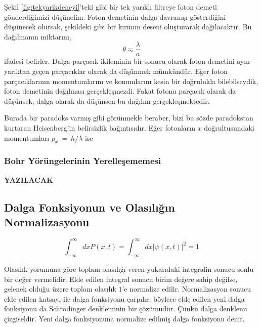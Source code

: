\documentclass[a4paper,12pt, twoside]{article}
\newcommand{\YAZILACAK}{{\vspace{18pt}\bf\Large \color{red} YAZILACAK}}
\begin{document}
Şekil \ref{fig:tekyarikdeneyi}'teki gibi bir tek yarıklı filtreye foton demeti gönderdiğimizi düşünelim. Foton demetinin dalga davranışı gösterdiğini düşünecek olursak, şekildeki gibi bir kırınım deseni oluşturarak dağılacaktır. Bu dağılmanın miktarını,
\begin{equation*}
\theta \eqsim \frac{\lambda}{a}
\end{equation*}
ifadesi belirler. Dalga parçacık ikileminin bir sonucu olarak foton demetini aynı yarıktan geçen parçacıklar olarak da düşünmek mümkündür. Eğer foton parçacıklarının momentumlarını ve konumlarını kesin bir doğrulukla bilebilseydik, foton demetinin dağılması gerçekleşmezdi. Fakat fotonu parçacık olarak da düşünsek, dalga olarak da düşünsen bu dağılım gerçekleşmektedir. 

Burada bir paradoks varmış gibi görünmekle beraber, bizi bu sözde paradokstan kurtaran Heisenberg'in belirsizlik bağıntısıdır. Eğer fotonların $x$ doğrultusundaki momentumları $p_x~=~h/\lambda$ ise


\subsubsection{Bohr Yörüngelerinin Yerelleşememesi}
\YAZILACAK

\subsection{Dalga Fonksiyonun ve Olasılığın Normalizasyonu}

\begin{equation}
\int ^{\infty }_{-\infty }dxP\left( x,t\right) =\int ^{\infty }_{-\infty }dx\left| \psi \left( x,t\right) \right| ^{2}=1
\label{eq:probability_norm}
\end{equation}

Olasılık yorumuna göre toplam olasılığı veren yukarıdaki integralin  sonucu sonlu bir değer vermelidir.  Elde edilen integral sonucu birim değere sahip değilse, gelenek olduğu üzere toplam olasılık $1$'e normalize edilir.  Normalizasyon sonucu  elde edilen katsayı ile dalga fonksiyonu çarpılır, böylece elde edilen yeni dalga fonksiyonu da Schrödinger denkleminin bir çözümüdür. Çünkü dalga denklemi çizgiseldir. Yeni dalga fonksiyonuna normalize edilmiş dalga fonksiyonu denir.
\end{document}
